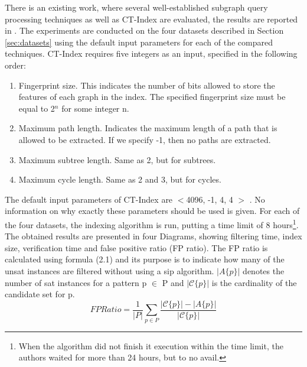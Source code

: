 \documentclass{l4proj}
\newcommand{\fancyC}{\mathcal{C}}
\begin{document}
There is an existing work, where several well-established subgraph query processing techniques as well as CT-Index are evaluated, the results are reported in \cite{foteini}. The experiments are conducted on the four datasets described in Section \ref{sec:datasets} using the default input parameters for each of the compared techniques. CT-Index requires five integers as an input, specified in the following order:
\begin{enumerate}
\item Fingerprint size. This indicates the number of bits allowed to store the features of each graph in the index. The specified fingerprint size must be equal to 2$^{n}$ for some integer n.
\item Maximum path length. Indicates the maximum length of a path that is allowed to be extracted. If we specify -1, then no paths are extracted.
\item Maximum subtree length. Same as 2, but for subtrees.
\item Maximum cycle length. Same as 2 and 3, but for cycles.
\end{enumerate}

The default input parameters of CT-Index are $<$4096, -1, 4, 4 $>$ \cite{ctindex, foteini}. No information on why exactly these parameters should be used is given. For each of the four datasets, the indexing algorithm is run, putting a time limit of 8 hours\footnote{When the algorithm did not finish it execution within the time limit, the authors waited for more than 24 hours, but to no avail.}. The obtained results are presented in four Diagrams, showing filtering time, index size, verification time and false positive ratio (FP ratio). The FP ratio is calculated using formula (2.1) and its purpose is to indicate how many of the \gls{unsat} instances are filtered without using a \gls{sip} algorithm. \textit{$|A\{p\}|$} denotes the number of \gls{sat} instances for a pattern p $\in$ P and \textit{$|\fancyC\{p\}|$} is the cardinality of the candidate set for p.
\begin{equation}
\label{eq:fpratio}
FP Ratio = \frac{1}{|P|} \sum_{p \in P} \frac{|\fancyC\{p\}| - |A\{p\}|}{|\fancyC\{p\}|}
\end{equation}
\end{document}

